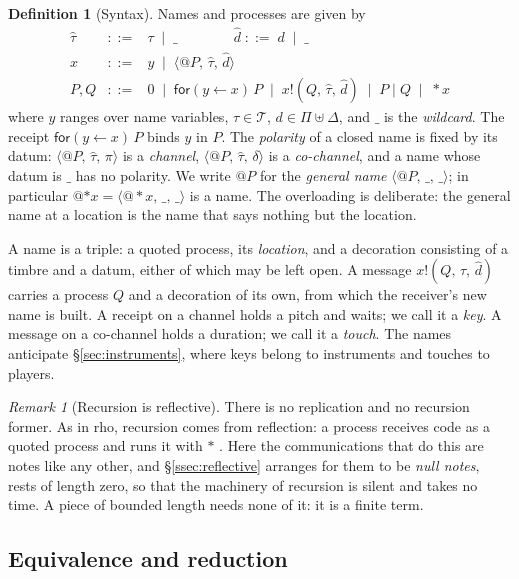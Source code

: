 \documentclass[11pt,a4paper]{article}
\makeatletter
\theoremstyle{plain}
\theoremstyle{definition}
\newtheorem{definition}[theorem]{Definition}
\theoremstyle{remark}
\newtheorem{remark}[theorem]{Remark}
\newcommand{\rhoc}{\textsf{rho}}
\newcommand{\Pit}{\Pi}
\newcommand{\Dur}{\Delta}
\newcommand{\Tim}{\mathcal{T}}
\newcommand{\nm}[3]{\langle @#1,\,#2,\,#3\rangle}
\newcommand{\snd}[4]{#1!(#2,\,#3,\,#4)}
\newcommand{\rcv}[3]{\mathsf{for}(#1 \leftarrow #2)\,#3}
\newcommand{\drop}{{*}}
\newcommand{\wild}{\_}
\makeatother
\begin{document}
\begin{definition}[Syntax]\label{def:syntax}
Names and processes are given by
\[
\begin{array}{rcl}
\hat\tau &::=& \tau \;\mid\; \wild
\qquad\qquad
\hat d \;::=\; d \;\mid\; \wild \\[3pt]
x &::=& y \;\mid\; \nm{P}{\hat\tau}{\hat d} \\[3pt]
P,Q &::=& 0 \;\mid\; \rcv{y}{x}{P} \;\mid\; \snd{x}{Q}{\hat\tau}{\hat d}
          \;\mid\; P \mid Q \;\mid\; \drop x
\end{array}
\]
where $y$ ranges over name variables, $\tau \in \Tim$,
$d \in \Pit \uplus \Dur$, and $\wild$ is the \emph{wildcard}. The receipt
$\rcv{y}{x}{P}$ binds $y$ in $P$. The \emph{polarity} of a closed name is fixed
by its datum: $\nm{P}{\hat\tau}{\pi}$ is a \emph{channel},
$\nm{P}{\hat\tau}{\delta}$ is a \emph{co-channel}, and a name whose datum is
$\wild$ has no polarity. We write $@P$ for the \emph{general name}
$\nm{P}{\wild}{\wild}$; in particular $@{\drop x} = \nm{\drop x}{\wild}{\wild}$ is
a name. The overloading is deliberate: the general name at a location is the
name that says nothing but the location.
\end{definition}

A name is a triple: a quoted process, its \emph{location}, and a decoration
consisting of a timbre and a datum, either of which may be left open. A message
$\snd{x}{Q}{\hat\tau}{\hat d}$ carries a process $Q$ and a decoration of its
own, from which the receiver's new name is built. A receipt on a channel holds a
pitch and waits; we call it a \emph{key}. A message on a co-channel holds a
duration; we call it a \emph{touch}. The names anticipate
\S\ref{sec:instruments}, where keys belong to instruments and touches to
players.

\begin{remark}[Recursion is reflective]\label{rem:constants}
There is no replication and no recursion former. As in \rhoc{}, recursion comes
from reflection: a process receives code as a quoted process and runs it with
$\drop$ \cite{Mer05}. Here the communications that do this are notes like any
other, and \S\ref{ssec:reflective} arranges for them to be \emph{null notes},
rests of length zero, so that the machinery of recursion is silent and takes no
time. A piece of bounded length needs none of it: it is a finite term.
\end{remark}

\subsection{Equivalence and reduction}
\end{document}
